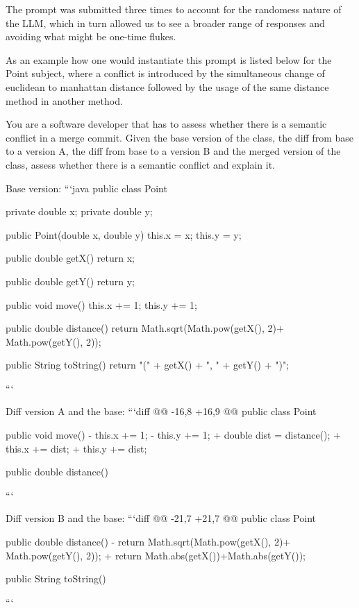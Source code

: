 The prompt was submitted three times to account for the randomess nature of the
LLM, which in turn allowed us to see a broader range of responses and avoiding
what might be one-time flukes.

As an example how one would instantiate this prompt is listed below for the
Point subject, where a conflict is introduced by the simultaneous change of
euclidean to manhattan distance followed by the usage of the same distance method
in another method.  
\begin{prompt}
You are a software developer that has to assess whether there is a semantic conflict in a merge commit.  Given the base version of the class, the diff from base to a version A, the diff from base to a version B and the merged version of the class, assess whether there is a semantic conflict and explain it. 

Base version:
```java
public class Point {
    private double x;
    private double y;

    public Point(double x, double y) {
        this.x = x;
        this.y = y;
    }

    public double getX() {
        return x;
    }

    public double getY() {
        return y;
    }

      public void move() {
          this.x += 1;
          this.y += 1;
      }

    public double distance() {
        return Math.sqrt(Math.pow(getX(), 2)+ Math.pow(getY(), 2));
    }

    public String toString() {
        return "(" + getX() + ", " + getY() + ")";
    }
}
```

Diff version A and the base:
```diff
@@ -16,8 +16,9 @@ public class Point {
      }

      public void move() {
-         this.x += 1;
-         this.y += 1;
+         double dist = distance();
+         this.x += dist;
+         this.y += dist;
      }

      public double distance() {
```

Diff version B and the base:
```diff
@@ -21,7 +21,7 @@ public class Point {
      }

      public double distance() {
-        return Math.sqrt(Math.pow(getX(), 2)+ Math.pow(getY(), 2));
+        return Math.abs(getX())+Math.abs(getY());
      }

      public String toString() {
```

}}
\end{prompt}
